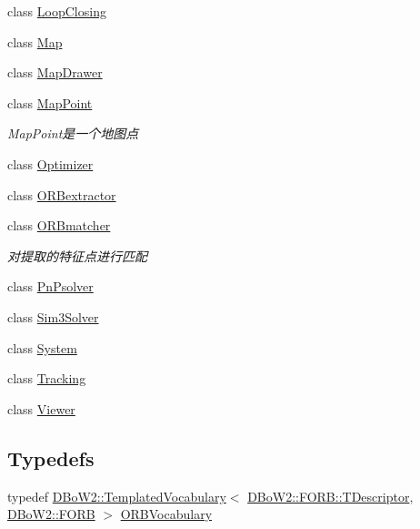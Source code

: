 \begin{DoxyCompactItemize}
\item 
class \mbox{\hyperlink{class_o_r_b___s_l_a_m2_1_1_loop_closing}{Loop\+Closing}}
\item 
class \mbox{\hyperlink{class_o_r_b___s_l_a_m2_1_1_map}{Map}}
\item 
class \mbox{\hyperlink{class_o_r_b___s_l_a_m2_1_1_map_drawer}{Map\+Drawer}}
\item 
class \mbox{\hyperlink{class_o_r_b___s_l_a_m2_1_1_map_point}{Map\+Point}}
\begin{DoxyCompactList}\small\item\em Map\+Point是一个地图点 \end{DoxyCompactList}\item 
class \mbox{\hyperlink{class_o_r_b___s_l_a_m2_1_1_optimizer}{Optimizer}}
\item 
class \mbox{\hyperlink{class_o_r_b___s_l_a_m2_1_1_o_r_bextractor}{O\+R\+Bextractor}}
\item 
class \mbox{\hyperlink{class_o_r_b___s_l_a_m2_1_1_o_r_bmatcher}{O\+R\+Bmatcher}}
\begin{DoxyCompactList}\small\item\em 对提取的特征点进行匹配 \end{DoxyCompactList}\item 
class \mbox{\hyperlink{class_o_r_b___s_l_a_m2_1_1_pn_psolver}{Pn\+Psolver}}
\item 
class \mbox{\hyperlink{class_o_r_b___s_l_a_m2_1_1_sim3_solver}{Sim3\+Solver}}
\item 
class \mbox{\hyperlink{class_o_r_b___s_l_a_m2_1_1_system}{System}}
\item 
class \mbox{\hyperlink{class_o_r_b___s_l_a_m2_1_1_tracking}{Tracking}}
\item 
class \mbox{\hyperlink{class_o_r_b___s_l_a_m2_1_1_viewer}{Viewer}}
\end{DoxyCompactItemize}
\subsection*{Typedefs}
\begin{DoxyCompactItemize}
\item 
typedef \mbox{\hyperlink{class_d_bo_w2_1_1_templated_vocabulary}{D\+Bo\+W2\+::\+Templated\+Vocabulary}}$<$ \mbox{\hyperlink{class_d_bo_w2_1_1_f_o_r_b_aef9b966d0293836fab9f55f1799ce0ed}{D\+Bo\+W2\+::\+F\+O\+R\+B\+::\+T\+Descriptor}}, \mbox{\hyperlink{class_d_bo_w2_1_1_f_o_r_b}{D\+Bo\+W2\+::\+F\+O\+RB}} $>$ \mbox{\hyperlink{namespace_o_r_b___s_l_a_m2_a2fafba714858cab1bb18d438e2e83c5d}{O\+R\+B\+Vocabulary}}
\end{DoxyCompactItemize}
